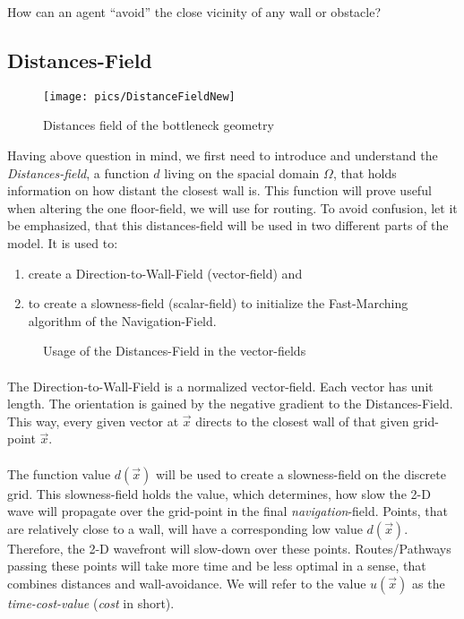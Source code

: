 How can an agent ``avoid'' the close vicinity of any wall or obstacle?

\subsection{Distances-Field}
\begin{figure}[h!]
\texttt{[image: pics/DistanceFieldNew]}
\caption{Distances field of the bottleneck geometry}
\label{fig:DistanceField2}
\end{figure}
Having above question in mind, we first need to introduce and understand the \textit{Distances-field}, a function $d$ living on the spacial domain $\Omega$, that holds information on how distant the closest wall is. This function will prove useful when altering the one floor-field, we will use for routing. To avoid confusion, let it be emphasized, that this distances-field will be used in two different parts of the model. It is used to:
\begin{enumerate}
\item create a Direction-to-Wall-Field (vector-field) and
\item to create a slowness-field (scalar-field) to initialize the Fast-Marching algorithm of the Navigation-Field.
\end{enumerate}

\begin{figure}[h!]
\begin{center}

\end{center}
\caption{Usage of the Distances-Field in the vector-fields}
\label{sequenceToVFs}
\end{figure}
\paragraph{}
The Direction-to-Wall-Field is a normalized vector-field. Each vector has unit length. The orientation is gained by the negative gradient to the Distances-Field. This way, every given vector at $\vec{x}$ directs to the closest wall of that given grid-point $\vec{x}$.
\paragraph{}
The function value $d(\vec{x})$ will be used to create a slowness-field on the discrete grid. This slowness-field holds the value, which determines, how slow the 2-D wave will propagate over the grid-point in the final \emph{navigation}-field. Points, that are relatively close to a wall, will have a corresponding low value $d(\vec{x})$. Therefore, the 2-D wavefront will slow-down over these points. Routes/Pathways passing these points will take more time and be less optimal in a sense, that combines distances and wall-avoidance. We will refer to the value $u(\vec{x})$ as the \emph{time-cost-value} (\emph{cost} in short).

